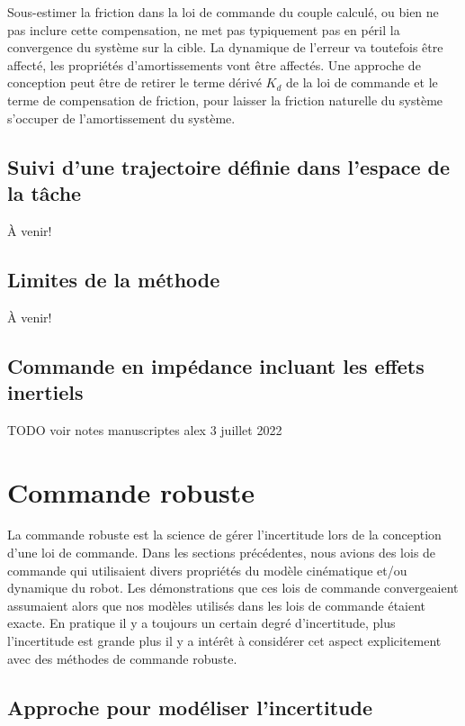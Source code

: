 Sous-estimer la friction dans la loi de commande du couple calculé, ou bien ne pas inclure cette compensation, ne met pas typiquement pas en péril la convergence du système sur la cible. La dynamique de l'erreur va toutefois être affecté, les propriétés d'amortissements vont être affectés. Une approche de conception peut être de retirer le terme dérivé $K_d$ de la loi de commande et le terme de compensation de friction, pour laisser la friction naturelle du système s'occuper de l'amortissement du système.  



\subsection{Suivi d'une trajectoire définie dans l'espace de la tâche}

À venir!

\subsection{Limites de la méthode}

À venir!

\subsection{Commande en impédance incluant les effets inertiels }

TODO voir notes manuscriptes alex 3 juillet 2022




\newpage
\section{Commande robuste}

La commande robuste est la science de gérer l'incertitude lors de la conception d'une loi de commande. Dans les sections précédentes, nous avions des lois de commande qui utilisaient divers propriétés du modèle cinématique et/ou dynamique du robot. Les démonstrations que ces lois de commande convergeaient assumaient alors que nos modèles utilisés dans les lois de commande étaient exacte. En pratique il y a toujours un certain degré d'incertitude, plus l'incertitude est grande plus il y a intérêt à considérer cet aspect explicitement avec des méthodes de commande robuste.

\subsection{Approche pour modéliser l'incertitude}

